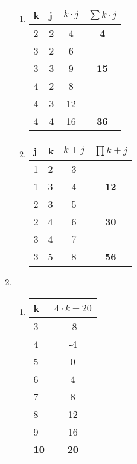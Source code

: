 \documentclass[a4paper]{article}
\begin{document}
\begin{enumerate}
\begin{enumerate}
			\item
			\begin{center}
				\begin{tabular}{|l|l|c|c|}
					\firsthline
						k & j & $k \cdot j$ & $ \displaystyle\sum k \cdot j $ \\
					\hline
						2 & 2 & 4 & \textbf{4} \\
					\hline
						3 & 2 & 6 &  \\
						3 & 3 & 9 & \textbf{15} \\
					\hline
						4 & 2 & 8 &  \\
						4 & 3 & 12 & \\
						4 & 4 & 16 & \textbf{36} \\
					\hline
				\end{tabular}
			\end{center}
			
			\item
			\begin{center}
				\begin{tabular}{|l|l|c|c|}
					\firsthline
						j & k & $k + j$ & $ \displaystyle\prod k + j $ \\
					\hline
						1 & 2 & 3 & \\
					\hline
						1 & 3 & 4 & \textbf{12} \\
					\hline
						2 & 3 & 5 & \\
					\hline
						2 & 4 & 6 & \textbf{30} \\
					\hline
						3 & 4 & 7 & \\
					\hline
						3 & 5 & 8 & \textbf{56} \\
					\hline
				\end{tabular}
			\end{center}
		\end{enumerate}
		
		\item
		\begin{enumerate}
			\item
			\begin{center}
				\begin{tabular}{|l|c|}
					\firsthline
						k & $4 \cdot k - 20$ \\
					\hline
						3 & -8 \\
					\hline
						4 & -4 \\
					\hline
						5 & 0 \\
					\hline
						6 & 4 \\
					\hline
						7 & 8 \\
					\hline
						8 & 12 \\
					\hline
						9 & 16 \\
					\hline
						\textbf{10} & \textbf{20} \\
					\hline
				\end{tabular}
			\end{center}
			

\end{enumerate}
\end{enumerate}
\end{document}
